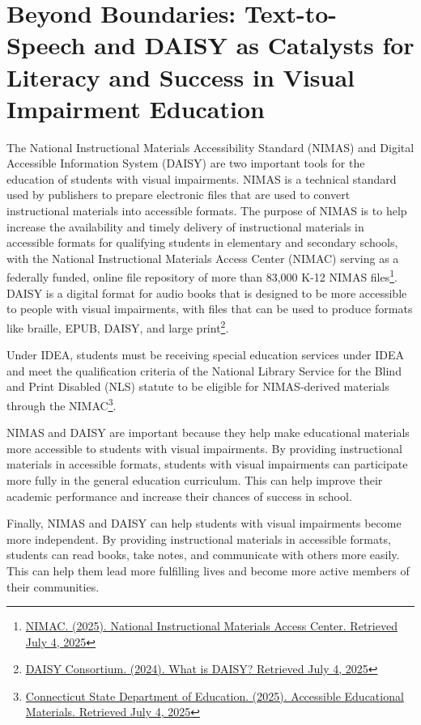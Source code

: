 \chapter{Beyond Boundaries: Text-to-Speech and DAISY as Catalysts for Literacy and Success in Visual Impairment Education}\label{audio}

The National Instructional Materials Accessibility Standard (NIMAS) and Digital Accessible Information System (DAISY) are two important tools for the education of students with visual impairments. NIMAS is a technical standard used by publishers to prepare electronic files that are used to convert instructional materials into accessible formats. The purpose of NIMAS is to help increase the availability and timely delivery of instructional materials in accessible formats for qualifying students in elementary and secondary schools, with the National Instructional Materials Access Center (NIMAC) serving as a federally funded, online file repository of more than 83,000 K-12 NIMAS files\footnote{\href{https://www.nimac.us/}{NIMAC. (2025). National Instructional Materials Access Center. Retrieved July 4, 2025}}. DAISY is a digital format for audio books that is designed to be more accessible to people with visual impairments, with files that can be used to produce formats like braille, EPUB, DAISY, and large print\footnote{\href{https://daisy.org/}{DAISY Consortium. (2024). What is DAISY? Retrieved July 4, 2025}}.

Under IDEA, students must be receiving special education services under IDEA and meet the qualification criteria of the National Library Service for the Blind and Print Disabled (NLS) statute to be eligible for NIMAS-derived materials through the NIMAC\footnote{\href{https://portal.ct.gov/SDE/Publications/Assistive-Technology-Guidelines-Section-1-For-Ages-3-22/Accessible-Educational-Materials}{Connecticut State Department of Education. (2025). Accessible Educational Materials. Retrieved July 4, 2025}}.

NIMAS and DAISY are important because they help make educational materials more accessible to students with visual impairments. By providing instructional materials in accessible formats, students with visual impairments can participate more fully in the general education curriculum. This can help improve their academic performance and increase their chances of success in school.

Finally, NIMAS and DAISY can help students with visual impairments become more independent. By providing instructional materials in accessible formats, students can read books, take notes, and communicate with others more easily. This can help them lead more fulfilling lives and become more active members of their communities.

